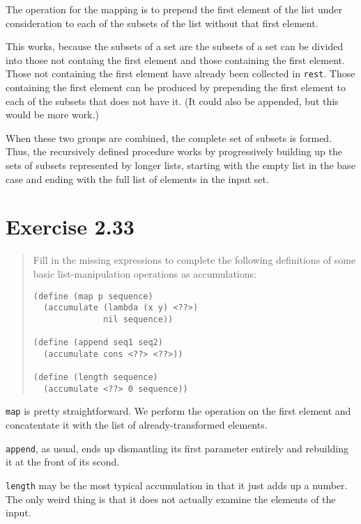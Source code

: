 \documentclass{article}
\begin{document}


The operation for the mapping is to prepend the first element of the list under
consideration to each of the subsets of the list without that first element.

This works, because the subsets of a set are the subsets of a set can be
divided into those not containg the first element and those containing the
first element. Those not containing the first element have already been
collected in \texttt{rest}. Those containing the first element can be produced
by prepending the first element to each of the subsets that does not have it.
(It could also be appended, but this would be more work.)

When these two groups are combined, the complete set of subsets is formed. Thus,
the recursively defined procedure works by progressively building up the sets of
subsets represented by longer lists, starting with the empty list in the base
case and ending with the full list of elements in the input set.

\section{Exercise 2.33}
\begin{quote}
    Fill in the missing expressions to complete the following definitions of
    some basic list-manipulation operations as accumulations:
    \begin{lstlisting}
(define (map p sequence)
  (accumulate (lambda (x y) <??>)
              nil sequence))

(define (append seq1 seq2)
  (accumulate cons <??> <??>))

(define (length sequence)
  (accumulate <??> 0 sequence))
    \end{lstlisting}
\end{quote}

\texttt{map} is pretty straightforward. We perform the operation on the first
element and concatentate it with the list of already-transformed elements.


\texttt{append}, as usual, ends up dismantling its first parameter entirely and
rebuilding it at the front of its scond.


\texttt{length} may be the most typical accumulation in that it just adds up a
number. The only weird thing is that it does not actually examine the elements
of the input.

\end{document}
